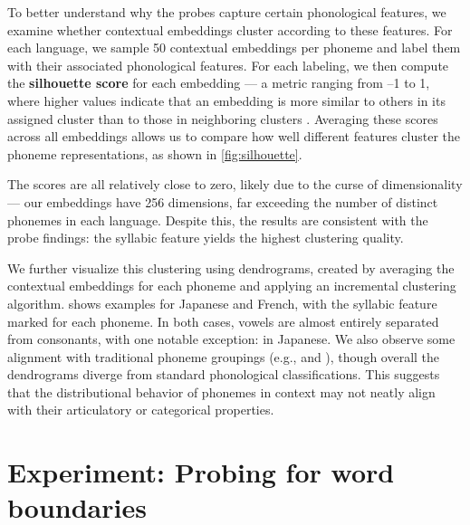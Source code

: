 To better understand why the probes capture certain phonological features, we examine whether contextual embeddings cluster according to these features. For each language, we sample 50 contextual embeddings per phoneme and label them with their associated phonological features. For each labeling, we then compute the \textbf{silhouette score} for each embedding --- a metric ranging from –1 to 1, where higher values indicate that an embedding is more similar to others in its assigned cluster than to those in neighboring clusters \citep{rousseeuw1987}. Averaging these scores across all embeddings allows us to compare how well different features cluster the phoneme representations, as shown in \cref{fig:silhouette}.

The scores are all relatively close to zero, likely due to the curse of dimensionality --- our embeddings have 256 dimensions, far exceeding the number of distinct phonemes in each language. Despite this, the results are consistent with the probe findings: the syllabic feature yields the highest clustering quality.

We further visualize this clustering using dendrograms, created by averaging the contextual embeddings for each phoneme and applying an incremental clustering algorithm.  shows examples for Japanese and French, with the syllabic feature marked for each phoneme. In both cases, vowels are almost entirely separated from consonants, with one notable exception:  in Japanese. We also observe some alignment with traditional phoneme groupings (e.g.,  and ), though overall the dendrograms diverge from standard phonological classifications. This suggests that the distributional behavior of phonemes in context may not neatly align with their articulatory or categorical properties.

\section{Experiment: Probing for word boundaries}


